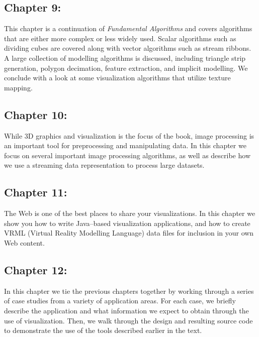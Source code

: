 \subsection*{Chapter 9: }

This chapter is a continuation of \emph{Fundamental Algorithms} and covers algorithms that are either more complex or less widely used. Scalar algorithms such as dividing cubes are covered along with vector algorithms such as stream ribbons. A large collection of modelling algorithms is discussed, including triangle strip generation, polygon decimation, feature extraction, and implicit modelling. We conclude with a look at some visualization algorithms that utilize texture mapping.

\subsection*{Chapter 10: }

While 3D graphics and visualization is the focus of the book, image processing is an important tool for preprocessing and manipulating data. In this chapter we focus on several important image processing algorithms, as well as describe how we use a streaming data representation to process large datasets. 

\subsection*{Chapter 11: }

The Web is one of the best places to share your visualizations. In this chapter we show you how to write Java--based visualization applications, and how to create VRML (Virtual Reality Modelling Language) data files for inclusion in your own Web content.

\subsection*{Chapter 12: }

In this chapter we tie the previous chapters together by working through a series of case studies from a variety of application areas. For each case, we briefly describe the application and what information we expect to obtain through the use of visualization. Then, we walk through the design and resulting source code to demonstrate the use of the tools described earlier in the text.

